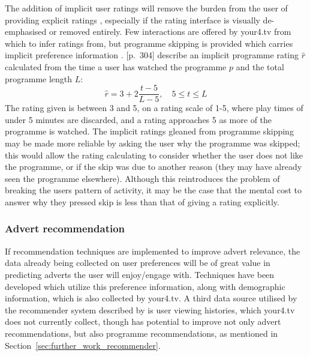 		The addition of implicit user ratings will remove the burden from the user of providing explicit ratings \citep{implicit_indicators}, especially if the rating interface is visually de-emphasised or removed entirely. Few interactions are offered by your4.tv from which to infer ratings from, but programme skipping is provided which carries implicit preference information \cite{exploiting_implicit_feedback}. \citep{recommender-systems-handbook}[p.~304] describe an implicit programme rating $\hat{r}$ calculated from the time a user has watched the programme $p$ and the total programme length $L$:
		$$
			\hat{r} = 3 + 2 \frac{t - 5}{L - 5},\quad 5 \leq t \leq L
		$$
The rating given is between 3 and 5, on a rating scale of 1-5, where play times of under 5 minutes are discarded, and a rating approaches 5 as more of the programme is watched. The implicit ratings gleaned from programme skipping may be made more reliable by asking the user why the programme was skipped; this would allow the rating calculating to consider whether the user does not like the programme, or if the skip was due to another reason (they may have already seen the programme elsewhere). Although this reintroduces the problem of breaking the users pattern of activity, it may be the case that the mental cost to answer why they pressed skip is less than that of giving a rating explicitly.

	\subsubsection{Advert recommendation}

	If recommendation techniques are implemented to improve advert relevance, the data already being collected on user preferences will be of great value in predicting adverts the user will enjoy/engage with. Techniques have been developed \cite{contextual_advertising} which utilize this preference information, along with demographic \cite{contextual_advertising} information, which is also collected by your4.tv. A third data source utilised by the recommender system described by \cite{contextual_advertising} is user viewing histories, which your4.tv does not currently collect, though has potential to improve not only advert recommendations, but also programme recommendations, as mentioned in Section~\ref{sec:further_work_recommender}.

